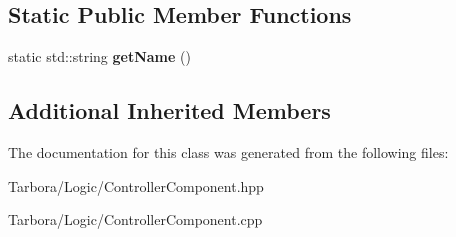 \subsection*{Static Public Member Functions}
\begin{DoxyCompactItemize}
\item 
\mbox{\label{classTarbora_1_1ControllerSystem_adca814b261e48d028367dffab874ed5e}} 
static std\+::string {\bfseries get\+Name} ()
\end{DoxyCompactItemize}
\subsection*{Additional Inherited Members}


The documentation for this class was generated from the following files\+:\begin{DoxyCompactItemize}
\item 
Tarbora/\+Logic/Controller\+Component.\+hpp\item 
Tarbora/\+Logic/Controller\+Component.\+cpp\end{DoxyCompactItemize}
